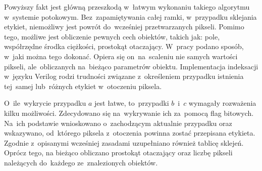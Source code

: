 Powyższy fakt jest główną przeszkodą w~łatwym wykonaniu takiego algorytmu w~systemie potokowym. 
Bez~zapamiętywania całej ramki, w~przypadku sklejania etykiet, niemożliwy jest powrót do~wcześniej przetwarzanych pikseli. 
Pomimo tego, możliwe jest obliczenie pewnych cech obiektów, takich jak: pole, współrzędne środka ciężkości, prostokąt otaczający. 
W~pracy \cite{COG} podano sposób, w~jaki można tego dokonać. 
Opiera się on~na~scaleniu nie samych wartości pikseli, ale~obliczanych na~bieżąco parametrów obiektu.
Implementacja indeksacji w~języku Verilog rodzi trudności związane z~określeniem przypadku istnienia tej~samej lub~różnych etykiet w~otoczeniu piksela. 

O~ile~wykrycie przypadku $a$ jest łatwe, to~przypadki $b$~i~$c$ wymagały rozważenia kilku możliwości. 
Zdecydowano się na~wykrywanie ich za~pomocą flag bitowych. 
Na~ich podstawie wnioskowano o~zachodzącym aktualnie przypadku oraz wskazywano, od~którego piksela z~otoczenia powinna zostać przepisana etykieta. 
Zgodnie z~opisanymi wcześniej zasadami uzupełniano również tablicę sklejeń.
Oprócz tego, na bieżąco obliczano prostokąt otaczający oraz liczbę pikseli należących do~każdego ze~znalezionych obiektów. 


